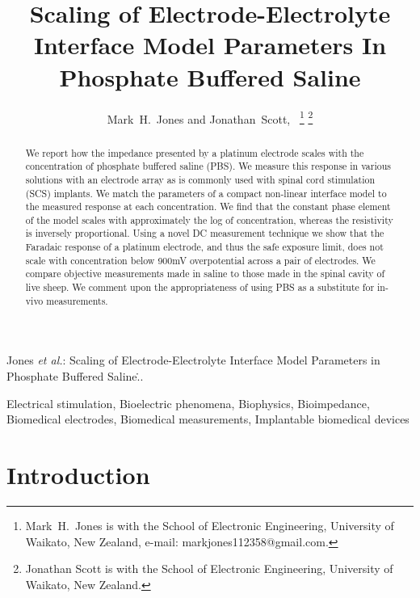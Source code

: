 \documentclass[journal, a4paper]{IEEEtran}
\begin{document}
\title{Scaling of Electrode-Electrolyte Interface Model Parameters In Phosphate Buffered Saline}

\author{Mark~H.~Jones and Jonathan~Scott,~
\thanks{Mark~H.~Jones is with the School of Electronic Engineering, University of Waikato, New Zealand, e-mail: markjones112358@gmail.com.}%
\thanks{Jonathan Scott is with the School of Electronic Engineering, University of Waikato, New Zealand.}
}

{Jones \MakeLowercase{\textit{et al.}}: Scaling of Electrode-Electrolyte Interface Model Parameters in Phosphate Buffered Saline\...}
\maketitle



\begin{abstract}
We report how the impedance presented by a platinum electrode scales with the concentration of phosphate buffered saline (PBS).
{
    \color{blue}
    We measure this response in various solutions with an electrode array as is commonly used with spinal cord stimulation (SCS) implants. We match the parameters of a compact non-linear interface model to the measured response at each concentration.
}
We find that the constant phase element of the model scales with approximately the log of concentration, whereas the resistivity is inversely proportional.
Using a novel DC measurement technique we show that the Faradaic response of a platinum electrode, and thus the safe exposure limit, does not scale with concentration below 900\thinspace mV overpotential across a pair of electrodes.
We compare objective measurements made in saline to those made in the spinal cavity of live sheep. We comment upon the appropriateness of using PBS as a substitute for in-vivo measurements.
\end{abstract}

\begin{IEEEkeywords}
    Electrical stimulation, Bioelectric phenomena, Biophysics, Bioimpedance, Biomedical electrodes, Biomedical measurements, Implantable biomedical devices
\end{IEEEkeywords}




\section{Introduction}
\end{document}

